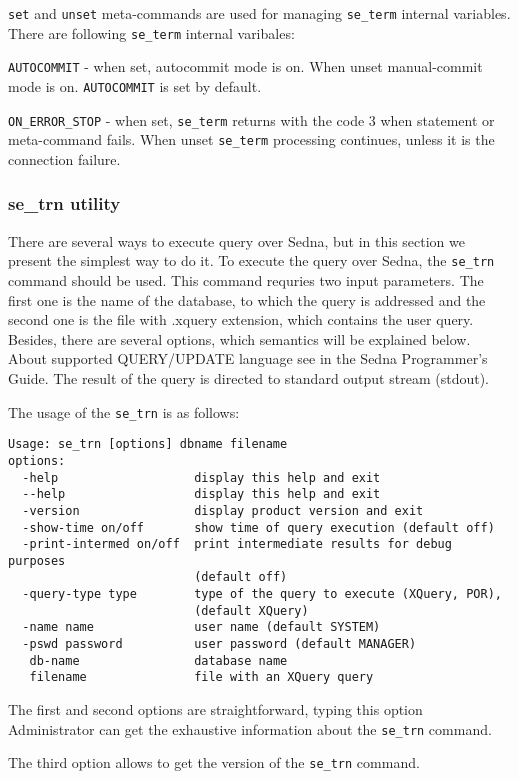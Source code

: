 \documentclass[a4paper,12pt]{article}
\begin{document}
\verb!set! and \verb!unset! meta-commands are used for managing \verb!se_term! internal variables. There are following \verb!se_term! internal varibales:

\verb!AUTOCOMMIT! - when set, autocommit mode is on. When unset manual-commit mode is on. \verb!AUTOCOMMIT! is set by default.

\verb!ON_ERROR_STOP! - when set, \verb!se_term! returns with the code 3 when statement or meta-command fails. When unset \verb!se_term! processing continues, unless it is the connection failure.

\subsubsection{se\_trn utility}
There are several ways to execute query over Sedna, but in this section we present the simplest way to do it. To execute the query over Sedna, the \verb!se_trn! command should be used. This command requries two input parameters. The first one is the name of the database, to which the query is addressed and the second one is the file with .xquery extension, which contains the user query. Besides, there are several options, which semantics will be explained below. About supported QUERY/UPDATE language see in the Sedna Programmer's Guide. The result of the query is directed to standard output stream (stdout). 

The usage of the \verb!se_trn! is as follows:

\begin{verbatim}
Usage: se_trn [options] dbname filename
options:
  -help                   display this help and exit
  --help                  display this help and exit
  -version                display product version and exit
  -show-time on/off       show time of query execution (default off)
  -print-intermed on/off  print intermediate results for debug purposes
                          (default off)
  -query-type type        type of the query to execute (XQuery, POR),
                          (default XQuery)
  -name name              user name (default SYSTEM)
  -pswd password          user password (default MANAGER)
   db-name                database name
   filename               file with an XQuery query
\end{verbatim}

The first and second options are straightforward, typing this option Administrator can get the exhaustive information about the \verb!se_trn! command.

The third option allows to get the version of the \verb!se_trn! command.
\end{document}
